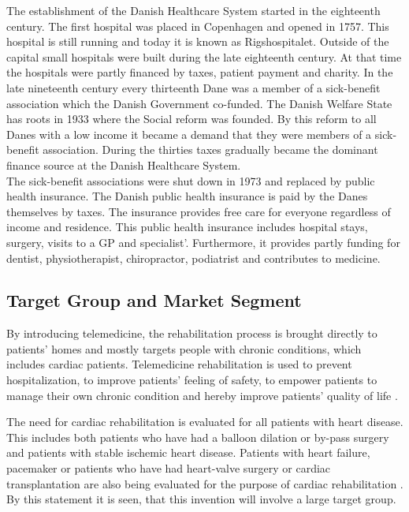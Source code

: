 The establishment of the Danish Healthcare System started in the eighteenth century. The first hospital was placed in Copenhagen and opened in 1757. This hospital is still running and today it is known as Rigshospitalet. Outside of the capital small hospitals were built during the late eighteenth century. At that time the hospitals were partly financed by taxes, patient payment and charity. In the late nineteenth century every thirteenth Dane was a member of a sick-benefit association which the Danish Government co-funded. The Danish Welfare State has roots in 1933 where the Social reform was founded. By this reform to all Danes with a low income it became a demand that they were members of a sick-benefit association. During the thirties taxes gradually became the dominant finance source at the Danish Healthcare System.\\ 
The sick-benefit associations were shut down in 1973 and replaced by public health insurance. The Danish public health insurance is paid by the Danes themselves by taxes. The insurance provides free care for everyone regardless of income and residence. This public health insurance includes hospital stays, surgery, visits to a GP and specialist'. Furthermore, it provides partly funding for dentist, physiotherapist, chiropractor, podiatrist and contributes to medicine.   \\


\subsection{Target Group and Market Segment}

By introducing telemedicine, the rehabilitation process is brought directly to patients' homes and mostly targets people with chronic conditions, which includes cardiac patients. Telemedicine rehabilitation is used to prevent hospitalization, to improve patients' feeling of safety, to empower patients to manage their own chronic condition and hereby improve patients' quality of life \cite{Emergence}. 

The need for cardiac rehabilitation is evaluated for all patients with heart disease. This includes both patients who have had a balloon dilation or by-pass surgery and patients with stable ischemic heart disease.
Patients with heart failure, pacemaker or patients who have had heart-valve surgery or cardiac transplantation are also being evaluated for the purpose of cardiac rehabilitation \cite{Rehabilitering}. By this statement it is seen, that this invention will involve a large target group.


